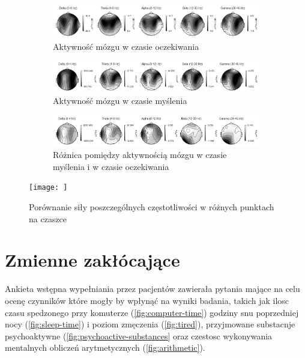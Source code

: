 \documentclass{./assets/wfis}
\begin{document}
\begin{figure}[h!]
    \centering
    \begin{subfigure}[b]{\textwidth}
    \centering
    \includegraphics[width=\columnwidth]{thesis/assets/waiting.png}
    \caption{Aktywność mózgu w czasie oczekiwania}
    \label{fig:waiting}
\end{subfigure}
\begin{subfigure}[b]{\textwidth}
    \centering
    \includegraphics[width=\columnwidth]{thesis/assets/thinking.png}
    \caption{Aktywność mózgu w czasie myślenia}
    \label{fig:thinking}
\end{subfigure}
\begin{subfigure}[b]{\textwidth}
    \centering
    \includegraphics[width=\columnwidth]{thesis/assets/diff.png}
    \caption{Różnica pomiędzy aktywnością mózgu w czasie myślenia i w czasie oczekiwania}
    \label{fig:diff}
\end{subfigure}
    \texttt{[image: ]}
    \caption{Porównanie siły poszczególnych częstotliwości w różnych punktach na czaszce}
    \label{fig:brain-heatmaps}
\end{figure}

\section{Zmienne zakłócające}\label{zmiennne-zaklucajace}
Ankieta wstępna wypełniania przez pacjentów zawierała pytania mające na celu ocenę czynników które mogły by wpłynąć na wyniki badania, takich jak ilosc czasu spedzonego przy komuterze (\autoref{fig:computer-time}) godziny snu poprzedniej nocy (\autoref{fig:sleep-time}) i poziom zmęczenia (\autoref{fig:tired}), przyjmowane substacnje psychoaktywne (\autoref{fig:psychoactive-substances} oraz czestosc wykonywania mentalnych obliczeń arytmetycznych (\autoref{fig:arithmetic}).
\end{document}
